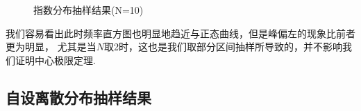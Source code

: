 \documentclass[12pt,a4paper,utf8]{ctexart}
\begin{document}
\begin{figure}[htb]
    \centering
    \hfill
    \hfill
    \hfill
    \caption{指数分布抽样结果(N=10)}
\end{figure}
\newpage

我们容易看出此时频率直方图也明显地趋近与正态曲线，但是峰偏左的现象比前者更为明显，
尤其是当$N$取2时，这也是我们取部分区间抽样所导致的，并不影响我们证明中心极限定理.

\subsection{自设离散分布抽样结果}
\end{document}
